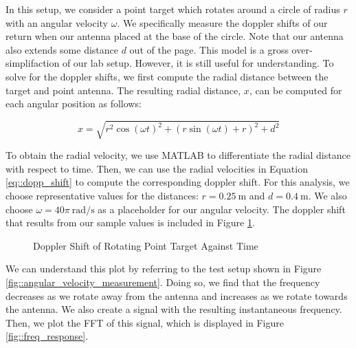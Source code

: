 \documentclass{article}
\begin{document}
\noindent In this setup, we consider a point target which rotates around a circle of radius $r$ with an angular velocity $\omega$. We specifically measure the doppler shifts of our return when our antenna placed at the base of the circle. Note that our antenna also extends some distance $d$ out of the page. This model is a gross over-simplifaction of our lab setup. However, it is still useful for understanding. To solve for the doppler shifts, we first compute the radial distance between the target and point antenna. The resulting radial distance, $x$, can be computed for each angular position as follows:

\begin{equation*}
	x = \sqrt{r^2\cos({\omega}t)^2 + (r\sin({\omega}t) + r)^2 + d^2}
\end{equation*}

\noindent To obtain the radial velocity, we use MATLAB to differentiate the radial distance with respect to time. Then, we can use the radial velocities in Equation \ref{eq::dopp_shift} to compute the corresponding doppler shift. For this analysis, we choose representative values for the distances: $r = 0.25\ \text{m}$ and $d = 0.4\ \text{m}$. We also choose $\omega = 40\pi\ \text{rad}/\text{s}$ as a placeholder for our angular velocity. The doppler shift that results from our sample values is included in Figure \ref{fig::dopp_shift_vs_time}.

\begin{figure}[H]
    	\centering
    	\caption{Doppler Shift of Rotating Point Target Against Time}
    	\label{fig::dopp_shift_vs_time}
\end{figure}
 
\noindent We can understand this plot by referring to the test setup shown in Figure \ref{fig::angular_velocity_measurement}. Doing so, we find that the frequency decreases as we rotate away from the antenna and increases as we rotate towards the antenna. We also create a signal with the resulting instantaneous frequency. Then, we plot the FFT of this signal, which is displayed in Figure \ref{fig::freq_response}.
\end{document}
